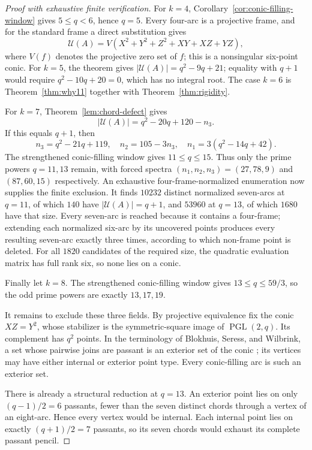 \documentclass[11pt]{article}
\theoremstyle{remark}
\newcommand{\cU}{\mathcal{U}}
\begin{document}
\begin{proof}[Proof with exhaustive finite verification]
For $k=4$, Corollary~\ref{cor:conic-filling-window} gives
$5\le q<6$, hence $q=5$. Every four-arc is a projective frame, and for the
standard frame a direct
substitution gives
\[
 \cU(A)=V(X^2+Y^2+Z^2+XY+XZ+YZ),
\]
where $V(f)$ denotes the projective zero set of $f$; this is a nonsingular
six-point conic. For $k=5$, the theorem gives
$|\cU(A)|=q^2-9q+21$; equality with $q+1$ would require
$q^2-10q+20=0$, which has no integral root. The case $k=6$ is
Theorem~\ref{thm:why11} together with Theorem~\ref{thm:rigidity}.

For $k=7$, Theorem~\ref{lem:chord-defect} gives
\[
 |\cU(A)|=q^2-20q+120-n_3.
\]
If this equals $q+1$, then
\[
 n_3=q^2-21q+119,\quad
n_2=105-3n_3,\quad
 n_1=3(q^2-14q+42).
\]
The strengthened conic-filling window gives $11\le q\le15$. Thus only the
prime powers $q=11,13$ remain, with forced spectra
$(n_1,n_2,n_3)=(27,78,9)$ and $(87,60,15)$ respectively. An exhaustive
four-frame-normalized enumeration now supplies the finite exclusion. It
finds $10232$ distinct normalized seven-arcs at $q=11$, of which $140$ have
$|\cU(A)|=q+1$, and $53960$ at $q=13$, of which $1680$ have that size.
Every seven-arc is reached because it contains a four-frame; extending each
normalized six-arc by its uncovered points produces every resulting
seven-arc exactly three times, according to which non-frame point is
deleted. For all $1820$ candidates of the required size, the quadratic
evaluation matrix has full rank six, so none lies on a conic.

Finally let $k=8$. The strengthened conic-filling window gives
$13\le q\le59/3$, so the odd prime powers are exactly $13,17,19$.

It remains to exclude these three fields. By projective equivalence fix the
conic $XZ=Y^2$, whose stabilizer is the symmetric-square image of
$\operatorname{PGL}(2,q)$. Its complement has $q^2$ points. In the
terminology of Blokhuis, Seress, and Wilbrink, a set whose pairwise joins
are passant is an exterior set of the conic
\cite[pp.~143,146]{BSW1992}; its vertices may have either internal or
exterior point type. Every conic-filling arc is such an exterior set.

There is already a structural reduction at $q=13$. An exterior point lies
on only $(q-1)/2=6$ passants, fewer than the seven distinct chords through
a vertex of an eight-arc. Hence every vertex would be internal. Each
internal point lies on exactly $(q+1)/2=7$ passants, so its seven chords
would exhaust its complete passant pencil.


\end{proof}
\end{document}
